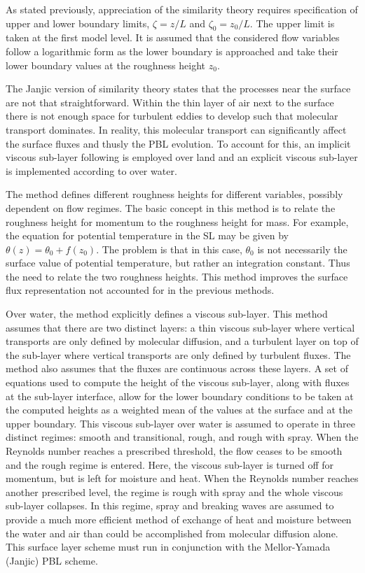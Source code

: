 As stated previously, appreciation of the similarity theory requires specification of upper and lower boundary limits, $\zeta = z/L$ and $\zeta_0 = z_0/L$. The upper limit is taken at the first model level. It is assumed that the considered flow variables follow a logarithmic form as the lower boundary is approached and take their lower boundary values at the roughness height $z_0$.

The Janjic version of similarity theory states that the processes near the surface are not that straightforward. Within the thin layer of air next to the surface there is not enough space for turbulent eddies to develop such that molecular transport dominates. In reality, this molecular transport can significantly affect the surface fluxes and thusly the PBL evolution. To account for this, an implicit viscous sub-layer following  \citet{Zilit} is employed over land and an explicit viscous sub-layer is implemented according to  \citet{Jan94} over water.

The  \citet{Zilit} method defines different roughness heights for different variables, possibly dependent on flow regimes. The basic concept in this method is to relate the roughness height for momentum to the roughness height for mass. For example, the equation for potential temperature in the SL may be given by $\theta(z) = \theta_0 + f(z_0)$. The problem is that in this case, $\theta_0$ is not necessarily the surface value of potential temperature, but rather an integration constant. Thus the need to relate the two roughness heights. This method improves the surface flux representation not accounted for in the previous methods.

Over water, the  \citet{Jan94} method explicitly defines a viscous sub-layer. This method assumes that there are two distinct layers: a thin viscous sub-layer where vertical transports are only defined by molecular diffusion, and a turbulent layer on top of the sub-layer where vertical transports are only defined by turbulent fluxes. The method also assumes that the fluxes are continuous across these layers. A set of equations used to compute the height of the viscous sub-layer, along with fluxes at the sub-layer interface, allow for the lower boundary conditions to be taken at the computed heights as a weighted mean of the values at the surface and at the upper boundary. This viscous sub-layer over water is assumed to operate in three distinct regimes: smooth and transitional, rough, and rough with spray. When the Reynolds number reaches a prescribed threshold, the flow ceases to be smooth and the rough regime is entered. Here, the viscous sub-layer is turned off for momentum, but is left for moisture and heat. When the Reynolds number reaches another prescribed level, the regime is rough with spray and the whole viscous sub-layer collapses. In this regime, spray and breaking waves are assumed to provide a much more efficient method of exchange of heat and moisture between the water and air than could be accomplished from molecular diffusion alone. This surface layer scheme must run in conjunction with the Mellor-Yamada (Janjic) PBL scheme.

